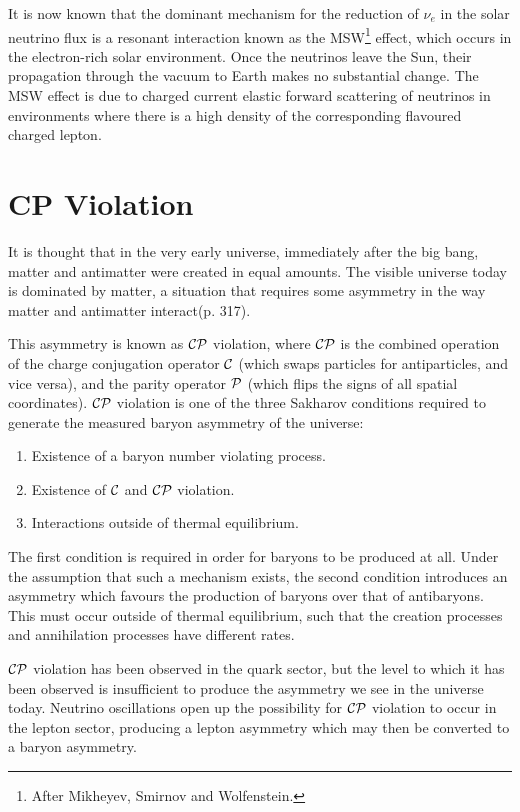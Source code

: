 It is now known that the dominant mechanism for the reduction of $\nu_e$ in the solar neutrino flux is a resonant interaction known as the MSW\footnote{After Mikheyev, Smirnov and Wolfenstein.} effect, which occurs in the electron-rich solar environment. Once the neutrinos leave the Sun, their propagation through the vacuum to Earth makes no substantial change. The MSW effect is due to charged current elastic forward scattering of neutrinos in environments where there is a high density of the corresponding flavoured charged lepton\citep{Zuber2004}.

\section{CP Violation}
It is thought that in the very early universe, immediately after the big bang, matter and antimatter were created in equal amounts. The visible universe today is dominated by matter, a situation that requires some asymmetry in the way matter and antimatter interact\citep{Perkins2000}(p. 317).

This asymmetry is known as $\mathcal{C}\mathcal{P}$ violation, where $\mathcal{C}\mathcal{P}$ is the combined operation of the charge conjugation operator $\mathcal{C}$ (which swaps particles for antiparticles, and vice versa), and the parity operator $\mathcal{P}$ (which flips the signs of all spatial coordinates). $\mathcal{C}\mathcal{P}$ violation is one of the three Sakharov conditions\citep{Sakharov1967} required to generate the measured baryon asymmetry of the universe:
\begin{enumerate}
    \item Existence of a baryon number violating process.
    \item Existence of $\mathcal{C}$ and $\mathcal{C}\mathcal{P}$ violation.
    \item Interactions outside of thermal equilibrium.
\end{enumerate}

The first condition is required in order for baryons to be produced at all. Under the assumption that such a mechanism exists, the second condition introduces an asymmetry which favours the production of baryons over that of antibaryons. This must occur outside of thermal equilibrium, such that the creation processes and annihilation processes have different rates.

$\mathcal{C}\mathcal{P}$ violation has been observed in the quark sector, but the level to which it has been observed is insufficient to produce the asymmetry we see in the universe today. Neutrino oscillations open up the possibility for $\mathcal{C}\mathcal{P}$ violation to occur in the lepton sector, producing a lepton asymmetry which may then be converted to a baryon asymmetry\citep{Riotto1999}.

